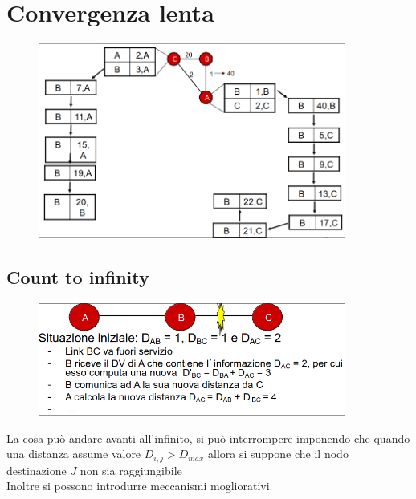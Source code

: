 \documentclass{report}
\begin{document}
        \section{Convergenza lenta}
            \begin{figure}[H]
                \includegraphics[width=0.9\textwidth]{3/converg.png}
            \end{figure}
            \subsection{Count to infinity}
                \begin{figure}[H]
                    \includegraphics[width=0.9\textwidth]{3/count.png}
                \end{figure}
                La cosa può andare avanti all'infinito, si può interrompere imponendo che quando una distanza assume valore $D_{i,j}>D_{max}$ allora si suppone che il nodo destinazione $J$ non sia raggiungibile
                \\
                Inoltre si possono introdurre meccanismi mogliorativi.
\end{document}
